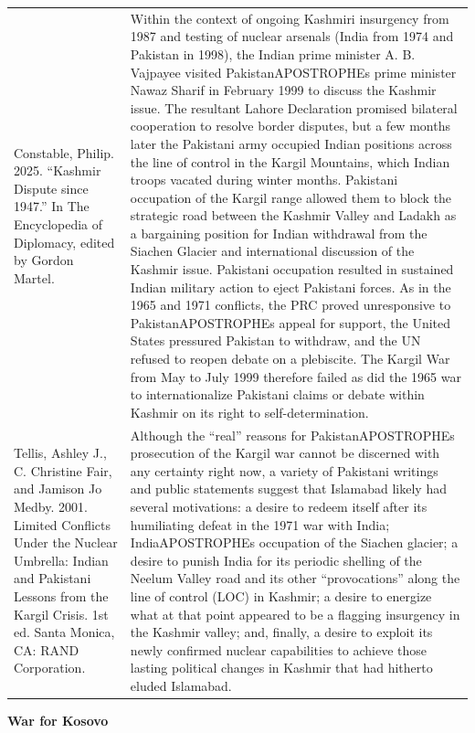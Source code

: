 {\begin{longtable}{p{}p{}}
Constable, Philip. 2025. “Kashmir Dispute since 1947.” In The Encyclopedia of Diplomacy, edited by Gordon Martel. &  Within the context of ongoing Kashmiri insurgency from 1987 and testing of nuclear arsenals (India from 1974 and Pakistan in 1998), the Indian prime minister A. B. Vajpayee visited PakistanAPOSTROPHEs prime minister Nawaz Sharif in February 1999 to discuss the Kashmir issue. The resultant Lahore Declaration promised bilateral cooperation to resolve border disputes, but a few months later the Pakistani army occupied Indian positions across the line of control in the Kargil Mountains, which Indian troops vacated during winter months. Pakistani occupation of the Kargil range allowed them to block the strategic road between the Kashmir Valley and Ladakh as a bargaining position for Indian withdrawal from the Siachen Glacier and international discussion of the Kashmir issue. Pakistani occupation resulted in sustained Indian military action to eject Pakistani forces. As in the 1965 and 1971 conflicts, the PRC proved unresponsive to PakistanAPOSTROPHEs appeal for support, the United States pressured Pakistan to withdraw, and the UN refused to reopen debate on a plebiscite. The Kargil War from May to July 1999 therefore failed as did the 1965 war to internationalize Pakistani claims or debate within Kashmir on its right to self-determination.
\\
Tellis, Ashley J., C. Christine Fair, and Jamison Jo Medby. 2001. Limited Conflicts Under the Nuclear Umbrella: Indian and Pakistani Lessons from the Kargil Crisis. 1st ed. Santa Monica, CA: RAND Corporation. & Although the “real” reasons for PakistanAPOSTROPHEs prosecution of the Kargil war cannot be discerned with any certainty right now, a variety of Pakistani writings and public statements suggest that Islamabad likely had several motivations: a desire to redeem itself after its humiliating defeat in the 1971 war with India; IndiaAPOSTROPHEs occupation of the Siachen glacier; a desire to punish India for its periodic shelling of the Neelum Valley road and its other “provocations” along the line of control (LOC) in Kashmir; a desire to energize what at that point appeared to be a flagging insurgency in the Kashmir valley; and, finally, a desire to exploit its newly confirmed nuclear capabilities to achieve those lasting political changes in Kashmir that had hitherto eluded Islamabad.
\\
\end{longtable}}
\clearpage
         \textbf{War for Kosovo} 

